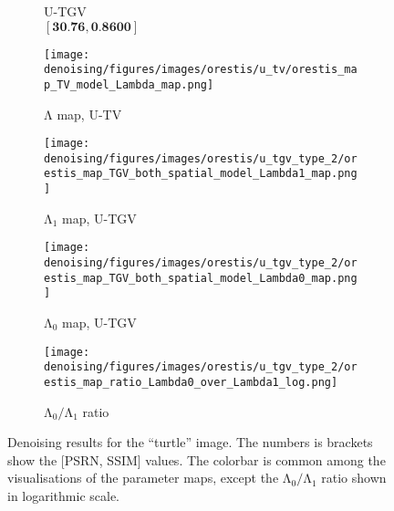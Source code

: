 \begin{figure}[!t]
\begin{subfigure}[t]{0.24\textwidth}
        \caption{U-TGV \\ $[\textbf{30.76},  \textbf{0.8600}]$ \newline}
    \end{subfigure}
    \hfill \vspace{-0.2cm}
    \begin{subfigure}[t]{0.24\textwidth}
        \texttt{[image: denoising/figures/images/orestis/u\_tv/orestis\_map\_TV\_model\_Lambda\_map.png]}
        \caption{$\mathrm{\Lambda}$ map, U-TV}
    \end{subfigure}
    \hfill
    \begin{subfigure}[t]{0.24\textwidth}
        \texttt{[image: denoising/figures/images/orestis/u\_tgv\_type\_2/orestis\_map\_TGV\_both\_spatial\_model\_Lambda1\_map.png]}
        \caption{$\mathrm{\Lambda_1}$ map, U-TGV}
    \end{subfigure}
    \hfill
    \begin{subfigure}[t]{0.24\textwidth}
        \texttt{[image: denoising/figures/images/orestis/u\_tgv\_type\_2/orestis\_map\_TGV\_both\_spatial\_model\_Lambda0\_map.png]}
        \caption{$\mathrm{\Lambda_0}$ map, U-TGV}
    \end{subfigure}
    \hfill
    \begin{subfigure}[t]{0.24\textwidth}
        \texttt{[image: denoising/figures/images/orestis/u\_tgv\_type\_2/orestis\_map\_ratio\_Lambda0\_over\_Lambda1\_log.png]}
    \caption{$\mathrm{\Lambda}_0/\mathrm{\Lambda}_1$ ratio}
    \end{subfigure}

    \begin{subfigure}[t]{1\textwidth}
        \centering
    \end{subfigure}

    \caption{Denoising results for the ``turtle'' image. The numbers is brackets show the [PSRN, SSIM] values. The colorbar is common among the visualisations of the parameter maps, except
    the $\mathrm{\Lambda}_0/\mathrm{\Lambda}_1$ ratio shown in logarithmic scale.   
    }
    \label{fig:turtle_test_case_noise_0_10}
\end{figure}
